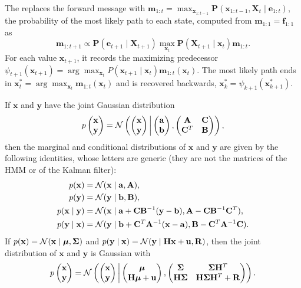 \documentclass[11pt, a4paper]{exam}
\begin{document}
\begin{recap}
    The  replaces the forward message with $\mathbf{m}_{1:t} = \max_{\mathbf{x}_{1:t-1}} \mathbf{P}(\mathbf{x}_{1:t-1}, \mathbf{X}_t \mid \mathbf{e}_{1:t})$, the probability of the most likely path to each state, computed from $\mathbf{m}_{1:1} = \mathbf{f}_{1:1}$ as
    \[
        \mathbf{m}_{1:t+1} \propto \mathbf{P}(\mathbf{e}_{t+1} \mid \mathbf{X}_{t+1}) \max_{\mathbf{x}_t} \mathbf{P}(\mathbf{X}_{t+1} \mid \mathbf{x}_t) \mathbf{m}_{1:t}.
    \]
    For each value $\mathbf{x}_{t+1}$, it records the maximizing predecessor $\psi_{t+1}(\mathbf{x}_{t+1}) = \arg \max_{\mathbf{x}_t} P(\mathbf{x}_{t+1} \mid \mathbf{x}_t) \mathbf{m}_{1:t}(\mathbf{x}_t)$. The most likely path ends in $\mathbf{x}_t^* = \arg \max_{\mathbf{x}_t} \mathbf{m}_{1:t}(\mathbf{x}_t)$ and is recovered backwards, $\mathbf{x}_k^* = \psi_{k+1}(\mathbf{x}_{k+1}^*)$.

    If $\mathbf{x}$ and $\mathbf{y}$ have the joint Gaussian distribution
    \[
        p\begin{pmatrix}\mathbf{x} \\ \mathbf{y}\end{pmatrix} = \mathcal{N}\left(\begin{pmatrix}\mathbf{x} \\ \mathbf{y}\end{pmatrix} \,\middle|\, \begin{pmatrix}\mathbf{a} \\ \mathbf{b}\end{pmatrix}, \begin{pmatrix}\mathbf{A} & \mathbf{C} \\ \mathbf{C}^T & \mathbf{B}\end{pmatrix}\right),
    \]
    then the marginal and conditional distributions of $\mathbf{x}$ and $\mathbf{y}$ are given by the following identities, whose letters are generic (they are not the matrices of the HMM or of the Kalman filter):
    \begin{align*}
        p(\mathbf{x}) & = \mathcal{N}(\mathbf{x} \mid \mathbf{a}, \mathbf{A}), \\
        p(\mathbf{y}) & = \mathcal{N}(\mathbf{y} \mid \mathbf{b}, \mathbf{B}), \\
        p(\mathbf{x} \mid \mathbf{y}) & = \mathcal{N}(\mathbf{x} \mid \mathbf{a} + \mathbf{C} \mathbf{B}^{-1} (\mathbf{y} - \mathbf{b}), \mathbf{A} - \mathbf{C} \mathbf{B}^{-1} \mathbf{C}^T), \\
        p(\mathbf{y} \mid \mathbf{x}) & = \mathcal{N}(\mathbf{y} \mid \mathbf{b} + \mathbf{C}^T \mathbf{A}^{-1} (\mathbf{x} - \mathbf{a}), \mathbf{B} - \mathbf{C}^T \mathbf{A}^{-1} \mathbf{C}).
    \end{align*}
    If $p(\mathbf{x}) = \mathcal{N}(\mathbf{x} \mid \bm{\mu}, \bm{\Sigma})$ and $p(\mathbf{y} \mid \mathbf{x}) = \mathcal{N}(\mathbf{y} \mid \mathbf{H} \mathbf{x} + \mathbf{u}, \mathbf{R})$, then the joint distribution of $\mathbf{x}$ and $\mathbf{y}$ is Gaussian with
    \[
        p\begin{pmatrix}\mathbf{x} \\ \mathbf{y}\end{pmatrix} = \mathcal{N}\left(\begin{pmatrix}\mathbf{x} \\ \mathbf{y}\end{pmatrix} \,\middle|\, \begin{pmatrix}\bm{\mu} \\ \mathbf{H} \bm{\mu} + \mathbf{u}\end{pmatrix}, \begin{pmatrix}\bm{\Sigma} & \bm{\Sigma} \mathbf{H}^T \\ \mathbf{H} \bm{\Sigma} & \mathbf{H} \bm{\Sigma} \mathbf{H}^T + \mathbf{R}\end{pmatrix}\right).
    \]


\end{recap}
\end{document}

